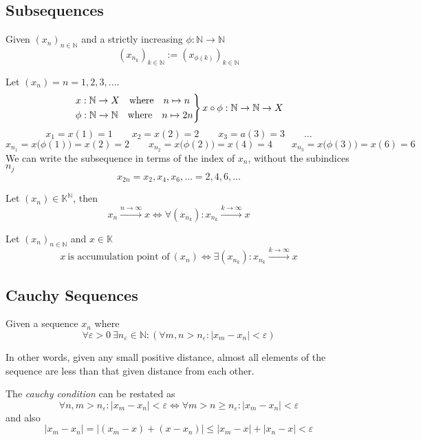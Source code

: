 \subsection{Subsequences}
\begin{definition}[Subsequence]
   Given \((x_n)_{n \in \mathbb{N}}\) and a strictly increasing \(\phi: \mathbb{N} \to \mathbb{N}\)
   \[(x_{n_k})_{k \in \mathbb{N}} := (x_{\phi(k)})_{k \in \mathbb{N}}\]
\end{definition}
\begin{example}
   Let \((x_n) = n = 1, 2, 3, \ldots\).
   \[\begin{drcases}
         x: \mathbb{N} \to X \quad\text{where}\quad n \mapsto n \\
         \phi: \mathbb{N} \to \mathbb{N} \quad\text{where}\quad n \mapsto 2n
   \end{drcases} x \circ \phi: \mathbb{N} \to \mathbb{N} \to X\]
   \[x_1 = x(1) = 1 \qquad x_2 = x(2) = 2 \qquad x_3 = a(3) = 3 \qquad \ldots\]
   \[x_{n_1} = x\big(\phi(1)\big) = x(2) = 2 \qquad x_{n_2} = x\big(\phi(2)\big) = x(4) = 4 \qquad x_{n_3} = x\big(\phi(3)\big) = x(6) = 6\]
   We can write the subsequence in terms of the index of \(x_n\), without the subindices \(n_j\)
   \[x_{2n} = x_2, x_4, x_6, \ldots = 2, 4, 6, \ldots\]
\end{example}

\begin{theorem}\label{thm:all_subseq_conv}
   Let \((x_n) \in \mathbb{K}^\mathbb{N}\), then
   \[x_n \xrightarrow{n \to \infty} x \iff \forall (x_{n_k}): x_{n_k} \xrightarrow{k \to \infty} x\]
\end{theorem}

\begin{theorem}\label{thm:cp_iff_subseq}
   Let \((x_n)_{n \in \mathbb{N}}\) and \(x \in \mathbb{K}\)
   \[x~\text{is accumulation point of}~(x_n) \iff \exists (x_{n_k}): x_{n_k} \xrightarrow{k \to \infty} x\]
\end{theorem}

\subsection{Cauchy Sequences}
\begin{definition}
   Given a sequence \(x_n\) where
   \[\forall \varepsilon > 0~\exists n_\varepsilon \in \mathbb{N}: (\forall m, n > n_\varepsilon: |x_m - x_n| < \varepsilon)\]
\end{definition}
\begin{remark}
   In other words, given any small positive distance, almost all elements of the sequence are less than that given distance from each other.
\end{remark}
\begin{remark}
   The \emph{cauchy condition} can be restated as
   \[\forall n, m > n_\varepsilon: |x_m - x_n| < \varepsilon \iff \forall m > n \geq n_\varepsilon: |x_m - x_n| < \varepsilon\]
   and also
   \[|x_m - x_n| = |(x_m - x) + (x - x_n)| \leq |x_m - x| + |x_n - x| < \varepsilon\]
\end{remark}

